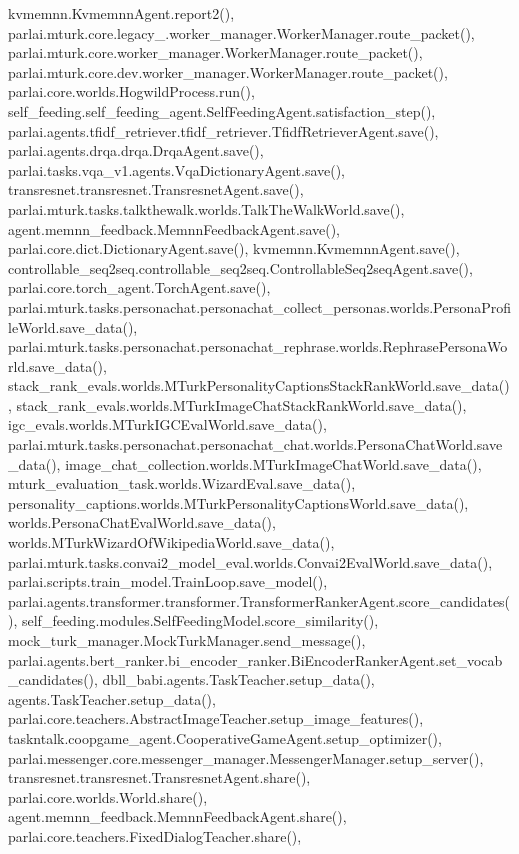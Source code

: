 kvmemnn.\+Kvmemnn\+Agent.\+report2(), parlai.\+mturk.\+core.\+legacy\+\_.\+worker\+\_\+manager.\+Worker\+Manager.\+route\+\_\+packet(), parlai.\+mturk.\+core.\+worker\+\_\+manager.\+Worker\+Manager.\+route\+\_\+packet(), parlai.\+mturk.\+core.\+dev.\+worker\+\_\+manager.\+Worker\+Manager.\+route\+\_\+packet(), parlai.\+core.\+worlds.\+Hogwild\+Process.\+run(), self\+\_\+feeding.\+self\+\_\+feeding\+\_\+agent.\+Self\+Feeding\+Agent.\+satisfaction\+\_\+step(), parlai.\+agents.\+tfidf\+\_\+retriever.\+tfidf\+\_\+retriever.\+Tfidf\+Retriever\+Agent.\+save(), parlai.\+agents.\+drqa.\+drqa.\+Drqa\+Agent.\+save(), parlai.\+tasks.\+vqa\+\_\+v1.\+agents.\+Vqa\+Dictionary\+Agent.\+save(), transresnet.\+transresnet.\+Transresnet\+Agent.\+save(), parlai.\+mturk.\+tasks.\+talkthewalk.\+worlds.\+Talk\+The\+Walk\+World.\+save(), agent.\+memnn\+\_\+feedback.\+Memnn\+Feedback\+Agent.\+save(), parlai.\+core.\+dict.\+Dictionary\+Agent.\+save(), kvmemnn.\+Kvmemnn\+Agent.\+save(), controllable\+\_\+seq2seq.\+controllable\+\_\+seq2seq.\+Controllable\+Seq2seq\+Agent.\+save(), parlai.\+core.\+torch\+\_\+agent.\+Torch\+Agent.\+save(), parlai.\+mturk.\+tasks.\+personachat.\+personachat\+\_\+collect\+\_\+personas.\+worlds.\+Persona\+Profile\+World.\+save\+\_\+data(), parlai.\+mturk.\+tasks.\+personachat.\+personachat\+\_\+rephrase.\+worlds.\+Rephrase\+Persona\+World.\+save\+\_\+data(), stack\+\_\+rank\+\_\+evals.\+worlds.\+M\+Turk\+Personality\+Captions\+Stack\+Rank\+World.\+save\+\_\+data(), stack\+\_\+rank\+\_\+evals.\+worlds.\+M\+Turk\+Image\+Chat\+Stack\+Rank\+World.\+save\+\_\+data(), igc\+\_\+evals.\+worlds.\+M\+Turk\+I\+G\+C\+Eval\+World.\+save\+\_\+data(), parlai.\+mturk.\+tasks.\+personachat.\+personachat\+\_\+chat.\+worlds.\+Persona\+Chat\+World.\+save\+\_\+data(), image\+\_\+chat\+\_\+collection.\+worlds.\+M\+Turk\+Image\+Chat\+World.\+save\+\_\+data(), mturk\+\_\+evaluation\+\_\+task.\+worlds.\+Wizard\+Eval.\+save\+\_\+data(), personality\+\_\+captions.\+worlds.\+M\+Turk\+Personality\+Captions\+World.\+save\+\_\+data(), worlds.\+Persona\+Chat\+Eval\+World.\+save\+\_\+data(), worlds.\+M\+Turk\+Wizard\+Of\+Wikipedia\+World.\+save\+\_\+data(), parlai.\+mturk.\+tasks.\+convai2\+\_\+model\+\_\+eval.\+worlds.\+Convai2\+Eval\+World.\+save\+\_\+data(), parlai.\+scripts.\+train\+\_\+model.\+Train\+Loop.\+save\+\_\+model(), parlai.\+agents.\+transformer.\+transformer.\+Transformer\+Ranker\+Agent.\+score\+\_\+candidates(), self\+\_\+feeding.\+modules.\+Self\+Feeding\+Model.\+score\+\_\+similarity(), mock\+\_\+turk\+\_\+manager.\+Mock\+Turk\+Manager.\+send\+\_\+message(), parlai.\+agents.\+bert\+\_\+ranker.\+bi\+\_\+encoder\+\_\+ranker.\+Bi\+Encoder\+Ranker\+Agent.\+set\+\_\+vocab\+\_\+candidates(), dbll\+\_\+babi.\+agents.\+Task\+Teacher.\+setup\+\_\+data(), agents.\+Task\+Teacher.\+setup\+\_\+data(), parlai.\+core.\+teachers.\+Abstract\+Image\+Teacher.\+setup\+\_\+image\+\_\+features(), taskntalk.\+coopgame\+\_\+agent.\+Cooperative\+Game\+Agent.\+setup\+\_\+optimizer(), parlai.\+messenger.\+core.\+messenger\+\_\+manager.\+Messenger\+Manager.\+setup\+\_\+server(), transresnet.\+transresnet.\+Transresnet\+Agent.\+share(), parlai.\+core.\+worlds.\+World.\+share(), agent.\+memnn\+\_\+feedback.\+Memnn\+Feedback\+Agent.\+share(), parlai.\+core.\+teachers.\+Fixed\+Dialog\+Teacher.\+share(), 